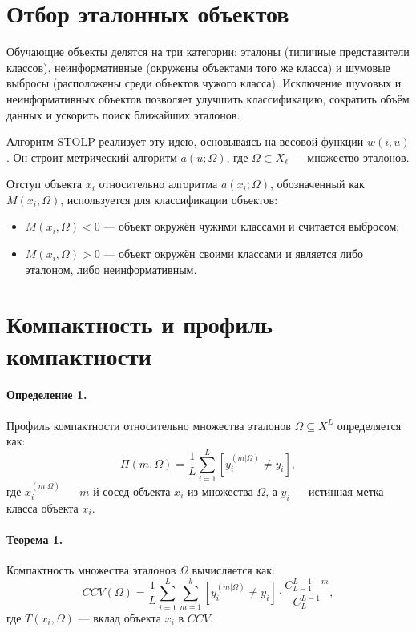 \section{Отбор эталонных объектов}
Обучающие объекты делятся на три категории: эталоны (типичные представители классов), неинформативные (окружены объектами того же класса) и шумовые выбросы (расположены среди объектов чужого класса). Исключение шумовых и неинформативных объектов позволяет улучшить классификацию, сократить объём данных и ускорить поиск ближайших эталонов.

Алгоритм STOLP реализует эту идею, основываясь на весовой функции \( w(i, u) \). Он строит метрический алгоритм \( a(u; \Omega) \), где \( \Omega \subset X_\ell \) — множество эталонов. 

Отступ объекта \( x_i \) относительно алгоритма \( a(x_i; \Omega) \), обозначенный как \( M(x_i, \Omega) \), используется для классификации объектов:
\begin{itemize}
    \item \( M(x_i, \Omega) < 0 \) — объект окружён чужими классами и считается выбросом;
    \item \( M(x_i, \Omega) > 0 \) — объект окружён своими классами и является либо эталоном, либо неинформативным.
\end{itemize}

\section{Компактность и профиль компактности}

\paragraph{Определение 1.} Профиль компактности относительно множества эталонов \( \Omega \subseteq X^L \) определяется как:
\[
\Pi(m, \Omega) = \frac{1}{L} \sum_{i=1}^L \left[ y_i^{(m|\Omega)} \neq y_i \right],
\]
где \( x_i^{(m|\Omega)} \) — \( m \)-й сосед объекта \( x_i \) из множества \( \Omega \), а \( y_i \) — истинная метка класса объекта \( x_i \).


\paragraph{Теорема 1.} Компактность множества эталонов \( \Omega \) вычисляется как:
\[
CCV(\Omega) = \frac{1}{L} \sum_{i=1}^L \sum_{m=1}^k \left[ y_i^{(m|\Omega)} \neq y_i \right] \cdot \frac{C_{L-1}^{L-1-m}}{C_L^{L-1}},
\]
где \( T(x_i, \Omega) \) — вклад объекта \( x_i \) в \( CCV \).


